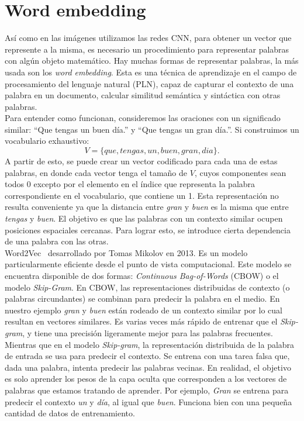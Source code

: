 \section{Word embedding} \label{sec:wordembedding}
Así como en las imágenes utilizamos las redes CNN, para obtener un vector que represente a la misma, es necesario un procedimiento para representar palabras con algún objeto matemático. Hay muchas formas de representar palabras, la más usada son los \textit{word embedding}. Esta es una técnica de aprendizaje en el campo de procesamiento del lenguaje natural (PLN), capaz de capturar el contexto de una palabra en un documento, calcular similitud semántica y sintáctica con otras palabras.\\

Para entender como funcionan, consideremos las oraciones con un significado similar: ``Que tengas un buen día.'' y ``Que tengas un gran día.''. Si construimos un vocabulario exhaustivo:
 \[ V = \{que, tengas, un, buen, gran, dia\}. \]
A partir de esto, se puede crear un vector codificado para cada una de estas palabras, en donde cada vector tenga el tamaño de $V$, cuyos componentes sean todos 0 excepto por el elemento en el índice que representa la palabra correspondiente en el vocabulario, que contiene un 1. Esta representación no resulta conveniente ya que la distancia entre \textit{gran} y \textit{buen} es la misma que entre \textit{tengas} y \textit{buen}.  El objetivo es que las palabras con un contexto similar ocupen posiciones espaciales cercanas. Para lograr esto, se introduce cierta dependencia de una palabra con las otras.\\

Word2Vec~\cite{mikolov2013distributed} desarrollado por Tomas Mikolov en 2013. Es un modelo particularmente eficiente desde el punto de vista computacional. Este modelo se encuentra disponible de dos formas: \textit{Continuous Bag-of-Words} (CBOW) o el modelo \textit{Skip-Gram}. En CBOW, las representaciones distribuidas de contexto (o palabras circundantes) se combinan para predecir la palabra en el medio. En nuestro ejemplo \textit{gran} y \textit{buen} están rodeado de un contexto similar por lo cual resultan en vectores similares. Es varias veces más rápido de entrenar que el \textit{Skip-gram}, y tiene una precisión ligeramente mejor para las palabras frecuentes. Mientras que en el modelo \textit{Skip-gram}, la representación distribuida de la palabra de entrada se usa para predecir el contexto. Se entrena con una tarea falsa que, dada una palabra, intenta predecir las palabras vecinas. En realidad, el objetivo es solo aprender los pesos de la capa oculta que corresponden a los vectores de palabras que estamos tratando de aprender. Por ejemplo, \textit{Gran} se entrena para predecir el contexto \textit{un} y  \textit{día}, al igual que \textit{buen}. Funciona bien con una pequeña cantidad de datos de entrenamiento.

